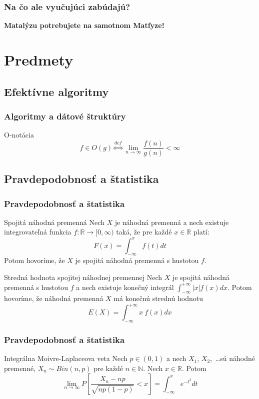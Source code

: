 \documentclass{beamer}
\begin{document}
\begin{frame}
\frametitle{Na čo ale vyučujúci zabúdajú?}
\pause
\begin{center}
\textbf{{\Large Matalýzu potrebujete na samotnom Matfyze!}}
\end{center}
\end{frame}

\section{Predmety}

\subsection{Efektívne algoritmy}

\begin{frame}
\frametitle{Algoritmy a dátové štruktúry}
\begin{block}{O-notácia}
$$f \in O(g) \overset{def}{\Longleftrightarrow} \lim_{n\to\infty} \dfrac{f(n)}{g(n)} < \infty$$
\end{block}
\end{frame}

\subsection{Pravdepodobnosť a štatistika}
\begin{frame}
\frametitle{Pravdepodobnosť a štatistika}
\pause
\begin{block}{Spojitá náhodná premenná}
Nech $X$ je náhodná premenná a nech existuje integrovateľná funkcia $f: \mathbb{R} \rightarrow [0, \infty)$ taká, že pre každé $x \in \mathbb{R}$ platí:
$$F(x) = \int_{-\infty}^{x} f(t) dt$$
Potom hovoríme, že $X$ je spojitá náhodná premenná s  hustotou $f$.
\end{block}

\begin{block}{Stredná hodnota spojitej náhodnej premennej}
Nech $X$ je spojitá náhodná premenná s hustotou $f$ a nech 
existuje konečný integrál $\int_{-\infty}^{+\infty}|x| f(x) dx$. 
Potom hovoríme, že náhodná premenná $X$ má konečnú strednú hodnotu
$$E(X) = \int_{-\infty}^{+\infty} x~f(x) dx $$
\end{block}
\end{frame}

\begin{frame}
\frametitle{Pravdepodobnosť a štatistika}
\begin{block}{Integrálna Moivre-Laplaceova veta}
Nech $p \in (0, 1)$ a nech $X_1$, $X_2$, \ldots sú náhodné premenné, 
$X_n \sim Bin(n, p)$ pre každé $n \in \mathbb{N}$. Nech $x \in \mathbb{R}$. 
Potom 
\pause 
$$\lim_{n\to\infty}P \left[ \dfrac{X_n - np}{\sqrt{np(1-p)}} < x \right] = \int_{-\infty}^{x} e^{-t^2} dt$$
\end{block}
\end{frame}
\end{document}
